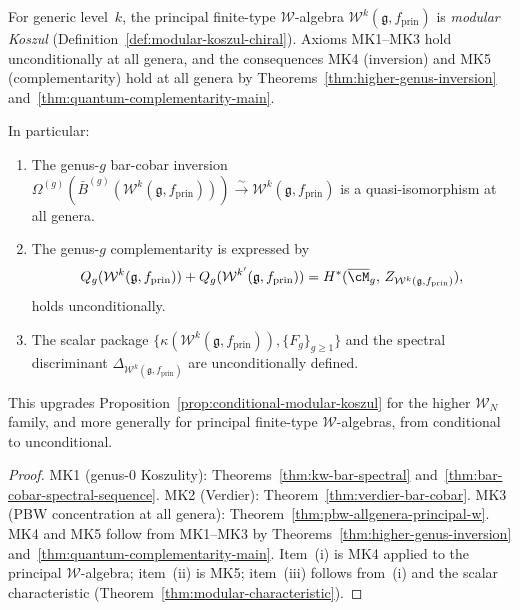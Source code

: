 \begin{corollary}
\label{cor:unconditional-allgenera-principal-w}
For generic level~$k$, the principal finite-type
$\mathcal{W}$-algebra
$\mathcal{W}^k(\mathfrak{g}, f_{\mathrm{prin}})$ is
\emph{modular Koszul}
\textup{(}Definition~\textup{\ref{def:modular-koszul-chiral})}.
Axioms \textup{MK1--MK3} hold unconditionally at all genera, and the
consequences \textup{MK4} \textup{(}inversion\textup{)}
and \textup{MK5} \textup{(}complementarity\textup{)} hold
at all genera by
Theorems~\textup{\ref{thm:higher-genus-inversion}}
and~\textup{\ref{thm:quantum-complementarity-main}}.

In particular:
\begin{enumerate}[label=\textup{(\roman*)}]
\item The genus-$g$ bar-cobar inversion
$\Omega^{(g)}(\bar{B}^{(g)}(\mathcal{W}^k(\mathfrak{g}, f_{\mathrm{prin}})))
\xrightarrow{\sim} \mathcal{W}^k(\mathfrak{g}, f_{\mathrm{prin}})$
is a quasi-isomorphism at all genera.
\item The genus-$g$ complementarity
is expressed by
\[
Q_g(\mathcal{W}^k(\mathfrak{g}, f_{\mathrm{prin}}))
+ Q_g(\mathcal{W}^{k'}(\mathfrak{g}, f_{\mathrm{prin}}))
= H^*(\overline{\cM}_g,\, Z_{\mathcal{W}^k(\mathfrak{g}, f_{\mathrm{prin}})}),
\]
holds unconditionally.
\item The scalar package
$\{\kappa(\mathcal{W}^k(\mathfrak{g}, f_{\mathrm{prin}})),
\{F_g\}_{g \geq 1}\}$ and the spectral discriminant
$\Delta_{\mathcal{W}^k(\mathfrak{g}, f_{\mathrm{prin}})}$
are unconditionally defined.
\end{enumerate}
This upgrades
Proposition~\textup{\ref{prop:conditional-modular-koszul}}
for the higher $\mathcal{W}_N$ family, and more generally for
principal finite-type $\mathcal{W}$-algebras,
from conditional to unconditional.
\end{corollary}

\begin{proof}
MK1 (genus-$0$ Koszulity):
Theorems~\ref{thm:kw-bar-spectral}
and~\ref{thm:bar-cobar-spectral-sequence}.
MK2 (Verdier):
Theorem~\ref{thm:verdier-bar-cobar}.
MK3 (PBW concentration at all genera):
Theorem~\ref{thm:pbw-allgenera-principal-w}.
MK4 and MK5 follow from MK1--MK3 by
Theorems~\ref{thm:higher-genus-inversion}
and~\ref{thm:quantum-complementarity-main}.
Item~(i) is MK4 applied to the principal
$\mathcal{W}$-algebra;
item~(ii) is MK5;
item~(iii) follows from~(i) and the
scalar characteristic
(Theorem~\ref{thm:modular-characteristic}).
\end{proof}

